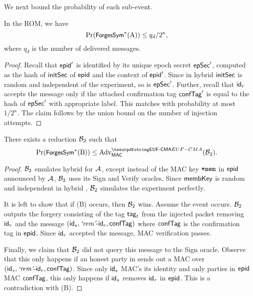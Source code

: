 We next bound the probability of each sub-event.
\begin{claim}
  In the ROM, we have
  \begin{equation*}
    \Pr(\forgessN\textnormal{(A)}) \leq q_d/2^\kappa,
  \end{equation*}
  where $q_d$ is the number of delivered messages.
\end{claim}
\begin{proof}
  Recall that $\hgnodeid'$ is identified by its unique epoch secret $\epochSecret'$, computed as the hash of $\initSecret$ of $\hgnodeid$ and the context of $\hgnodeid'$. Since in hybrid \hybridThreeN $\initSecret$ is random and independent of the experiment, so is $\epochSecret'$. Further, recall that $\id_r$ accepts the message only if the attached confirmation tag $\confTag'$ is equal to the hash of $\epochSecret'$ with appropriate label. This matches with probability at most $1/2^\kappa$. The claim follows by the union bound on the number of injection attempts.
\end{proof}

\begin{claim}
  There exists a reduction $\Bdv[2]$ such that
  \begin{equation*}
    \Pr(\forgessN\textnormal{(B)}) \leq \textnormal{Adv}^{\ufcma}_{\mac}(\Bdv[2]).
  \end{equation*}
\end{claim}
\begin{proof}
  $\Bdv[2]$ emulates hybrid \hybridThreeN for $\Adv$, except instead of the MAC key $\members$ in $\hgnodeid$ announced by $\Adv$, $\Bdv[2]$ uses its \ufcma Sign and Verify oracles. Since $\membershipKey$ is random and independent in hybrid \hybridThreeN, $\Bdv[2]$ simulates the experiment perfectly.

  It is left to show that if \forgessN(B) occurs, then $\Bdv[2]$ wins. Assume the event occurs. $\Bdv[2]$ outputs the forgery consisting of the tag $\macsig_t$ from the injected packet removing $\id_r$ and the message $(\id_s, \hglr\md\id_r, \confTag)$ where $\confTag$ is the confirmation tag in $\hgnodeid$. Since $\id_r$ accepted the message, MAC verification passes.

  Finally, we claim that $\Bdv[2]$ did not query this message to the Sign oracle. Observe that this only happens if an honest party in sends out a MAC over $(\id_s, \hglr\md\id_r, \confTag)$. Since only $\id_s$ MAC's its identity and only parties in $\hgnodeid$ MAC $\confTag$, this only happens if $\id_s$ removes $\id_r$ in $\hgnodeid$. This is a contradiction with \forgess(B).
\end{proof}

